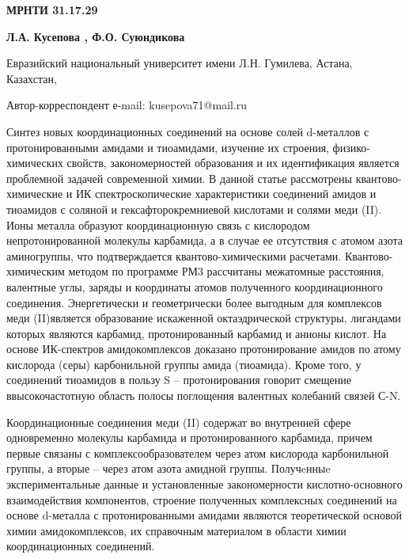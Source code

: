\newpage
{\bfseries МРНТИ 31.17.29}


\begin{center}
{\bfseries Л.А. Кусепова , Ф.О. Суюндикова}

Евразийский национальный университет имени Л.Н. Гумилева, Астана,
Казахстан,

Автор-корреспондент е-mail: kusepova71@mail.ru
\end{center}

Синтез новых координационных соединений на основе солей d-металлов с
протонированными амидами и тиоамидами, изучение их строения,
физико-химических свойств, закономерностей образования и их
идентификация является проблемной задачей современной химии. В данной
статье рассмотрены квантово-химические и ИК спектроскопические
характеристики соединений амидов и тиоамидов с соляной и
гексафторокремниевой кислотами и солями меди (II). Ионы металла образуют
координационную связь с кислородом непротонированной молекулы карбамида,
а в случае ее отсутствия с атомом азота аминогруппы, что подтверждается
квантово-химическими расчетами. Квантово-химическим методом по программе
РМ3 рассчитаны межатомные расстояния, валентные углы, заряды и
координаты атомов полученного координационного соединения. Энергетически
и геометрически более выгодным для комплексов меди (II)является
образование искаженной октаэдрической структуры, лигандами которых
являются карбамид, протонированный карбамид и анионы кислот. На основе
ИК-спектров амидокомплексов доказано протонирование амидов по атому
кислорода (серы) карбонильной группы амида (тиоамида). Кроме того, у
соединений тиоамидов в пользу S -- протонирования говорит смещение
ввысокочастотную область полосы поглощения валентных колебаний связей
С-N.

Координационные соединения меди (II) содержат во внутренней сфере
одновременно молекулы карбамида и протонированного карбамида, причем
первые связаны с комплексообразователем через атом кислорода
карбонильной группы, а вторые -- через атом азота амидной группы.
Получeнныe экспериментальные данные и установленные закономерности
кислотно-основного взаимодействия компонентов, строение полученных
комплексных соединений на основе d-металла с протонированными амидами
являются теоретической основой химии амидокомплексов, их справочным
материалом в области химии координационных соединений.


